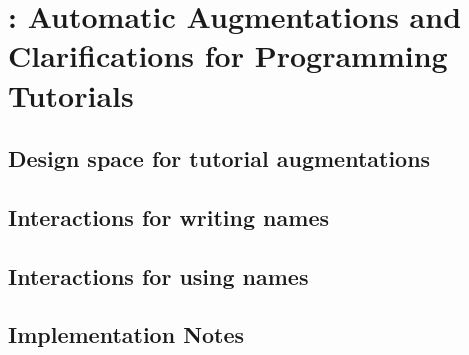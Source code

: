\section{\systemname{}: Automatic Augmentations and Clarifications for Programming Tutorials}

\subsection{Design space for tutorial augmentations}

\subsection{Interactions for writing \glspl{name}}

\subsection{Interactions for using \glspl{name}}

\subsection{Implementation Notes}

